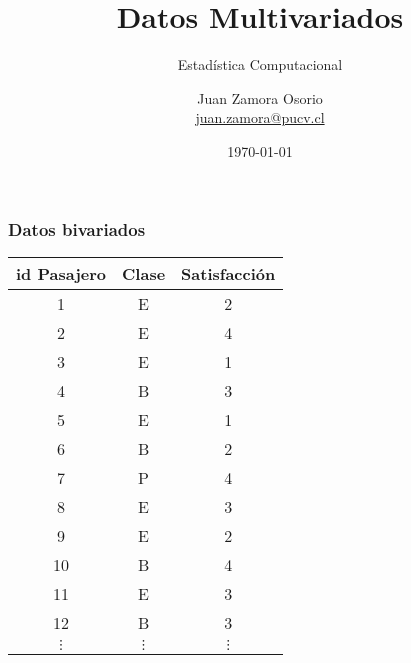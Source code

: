 \documentclass[table]{beamer}
\title{Datos Multivariados}
\subtitle{Estadística Computacional}
\author[J.Z.O-2023]{Juan Zamora Osorio\\\url{juan.zamora@pucv.cl}}
\institute[PUCV]{Instituto de Estadística\\Pontificia Universidad Cat\'olica de Valpara\'iso}
\date{\today}
\begin{document}
\frame{\titlepage}




\begin{frame}
    \frametitle{Datos bivariados}
    \begin{center}
        \begin{tabular}{c|c|c}
            id Pasajero & Clase & Satisfacción \\
            \hline
            1 & E & 2 \\
            2 & E & 4 \\
            3 & E & 1 \\
            4 & B & 3 \\
            5 & E & 1 \\
            6 & B & 2 \\
            7 & P & 4 \\
            8 & E & 3 \\
            9 & E & 2 \\
            10 & B & 4 \\
            11 & E & 3 \\
            12 & B & 3 \\
            $\vdots$ & $\vdots$ & $\vdots$
        \end{tabular}
    \end{center}
\end{frame}
\end{document}
